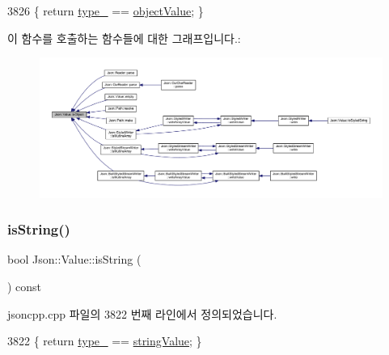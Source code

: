 \begin{DoxyCode}
3826 \{ \textcolor{keywordflow}{return} \hyperlink{class_json_1_1_value_abd222c2536dc88bf330dedcd076d2356}{type\_} == \hyperlink{namespace_json_a7d654b75c16a57007925868e38212b4eae8386dcfc36d1ae897745f7b4f77a1f6}{objectValue}; \}
\end{DoxyCode}
이 함수를 호출하는 함수들에 대한 그래프입니다.\+:\nopagebreak
\begin{figure}[H]
\begin{center}
\leavevmode
\includegraphics[width=350pt]{class_json_1_1_value_a8cf96c0f2a552051fcfc78ffee60e037_icgraph}
\end{center}
\end{figure}
\mbox{\label{class_json_1_1_value_a71e1f82cf1c3eaf969d400dcffb163a6}} 
\subsubsection{\texorpdfstring{is\+String()}{isString()}}
{\footnotesize\ttfamily bool Json\+::\+Value\+::is\+String (\begin{DoxyParamCaption}{ }\end{DoxyParamCaption}) const}



jsoncpp.\+cpp 파일의 3822 번째 라인에서 정의되었습니다.


\begin{DoxyCode}
3822 \{ \textcolor{keywordflow}{return} \hyperlink{class_json_1_1_value_abd222c2536dc88bf330dedcd076d2356}{type\_} == \hyperlink{namespace_json_a7d654b75c16a57007925868e38212b4ea804ef857affea2d415843c73f261c258}{stringValue}; \}
\end{DoxyCode}
\mbox{\label{class_json_1_1_value_abdda463d3269015f883587349726cfbc}} 
